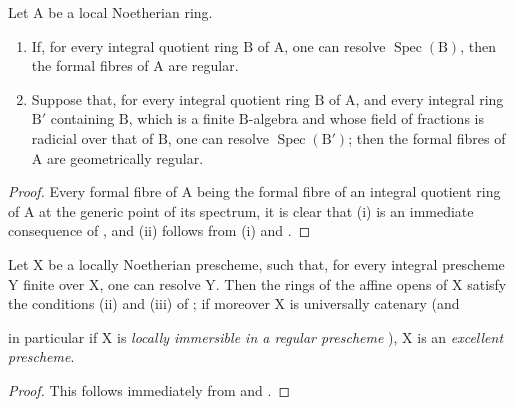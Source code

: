 \begin{corollary}[7.9.4]
\label{IV.7.9.4}
Let $\mathrm{A}$ be a local Noetherian ring.
\begin{enumerate}[label=(\roman*)]
  \item If, for every integral quotient ring $\mathrm{B}$ of $\mathrm{A}$, one can resolve $\operatorname{Spec}(\mathrm{B})$, then the formal fibres of $\mathrm{A}$ are regular.
  \item Suppose that, for every integral quotient ring $\mathrm{B}$ of $\mathrm{A}$, and every integral ring $\mathrm{B}'$ containing $\mathrm{B}$, which is a finite $\mathrm{B}$-algebra and whose field of fractions is radicial over that of $\mathrm{B}$, one can resolve $\operatorname{Spec}(\mathrm{B}')$; then the formal fibres of $\mathrm{A}$ are geometrically regular.
\end{enumerate}
\end{corollary}

\begin{proof}
Every formal fibre of $\mathrm{A}$ being the formal fibre of an integral quotient ring of $\mathrm{A}$ at the generic point of its spectrum, it is clear that (i) is an immediate consequence of , and (ii) follows from (i) and .
\end{proof}

\begin{proposition}[7.9.5]
\label{IV.7.9.5}
Let $\mathrm{X}$ be a locally Noetherian prescheme, such that, for every integral prescheme $\mathrm{Y}$ finite over $\mathrm{X}$, one can resolve $\mathrm{Y}$. Then the rings of the affine opens of $\mathrm{X}$ satisfy the conditions (ii) and (iii) of ; if moreover $\mathrm{X}$ is universally catenary  (and


in particular if $\mathrm{X}$ is \emph{locally immersible in a regular prescheme} ), $\mathrm{X}$ is an \emph{excellent prescheme}.
\end{proposition}

\begin{proof}
This follows immediately from  and .
\end{proof}


